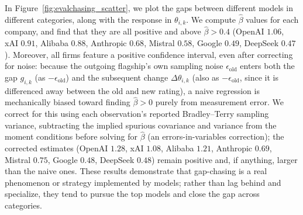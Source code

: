 In Figure~\ref{fig:evalchasing_scatter}, we plot the gaps between different models in different categories, along with the response in $\theta_{i,k}$.
We compute $\hat{\beta}$ values for each company, and find that they are all positive and above $\hat{\beta} > 0.4$ (OpenAI $1.06$, xAI $0.91$, Alibaba $0.88$, Anthropic $0.68$, Mistral $0.58$, Google $0.49$, DeepSeek $0.47$).
Moreover, all firms feature a positive confidence interval, even after correcting for noise: because the outgoing flagship's own sampling noise $\epsilon_{\text{old}}$ enters both the gap $g_{i,k}$ (as $-\epsilon_{\text{old}}$) and the subsequent change $\Delta\theta_{i,k}$ (also as $-\epsilon_{\text{old}}$, since it is differenced away between the old and new rating), a naive regression is mechanically biased toward finding $\hat\beta>0$ purely from measurement error. We correct for this using each observation's reported Bradley--Terry sampling variance, subtracting the implied spurious covariance and variance from the moment conditions before solving for $\hat\beta$ (an errors-in-variables correction); the corrected estimates (OpenAI $1.28$, xAI $1.08$, Alibaba $1.21$, Anthropic $0.69$, Mistral $0.75$, Google $0.48$, DeepSeek $0.48$) remain positive and, if anything, larger than the naive ones.
These results demonstrate that gap-chasing is a real phenomenon or strategy implemented by models; rather than lag behind and specialize, they tend to pursue the top models and close the gap across categories.

